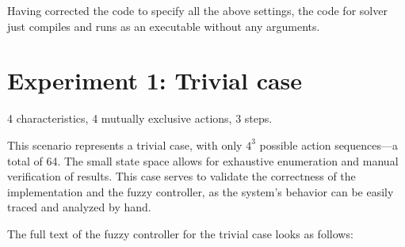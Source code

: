 \documentclass[12pt, a4paper]{article}
\begin{document}
	Having corrected the code to specify all the above settings, the code for solver just compiles and runs as an executable without any arguments.
	
	\section{Experiment 1: Trivial case}\label{trivial-case}

	4 characteristics, 4 mutually exclusive actions, 3 steps.

	This scenario represents a trivial case, with only $4^{3}$ possible action sequences—a total of 64.
	The small state space allows for exhaustive enumeration and manual verification of results.
	This case serves to validate the correctness of the implementation and the fuzzy controller, as the system's behavior can be easily traced and analyzed by hand.

	The full text of the fuzzy controller for the trivial case looks as follows:
	
\end{document}
